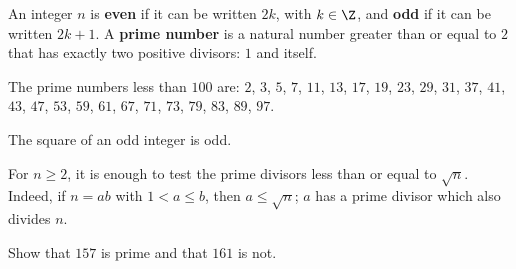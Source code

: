 \begin{keypoint}[Definitions]
An integer $n$ is \textbf{even} if it can be written $2k$, with $k\in\Z$, and \textbf{odd} if it can be written $2k+1$.
A \textbf{prime number} is a natural number greater than or equal to $2$ that has exactly two positive divisors: $1$ and itself.
\end{keypoint}
The prime numbers less than $100$ are: $2$, $3$, $5$, $7$, $11$, $13$, $17$, $19$, $23$, $29$, $31$, $37$, $41$, $43$, $47$, $53$, $59$, $61$, $67$, $71$, $73$, $79$, $83$, $89$, $97$.
\begin{keypoint}
The square of an odd integer is odd.
\end{keypoint}
\begin{method}
For $n\geq2$, it is enough to test the prime divisors less than or equal to $\sqrt n$. Indeed, if $n=ab$ with $1<a\leq b$, then $a\leq\sqrt n$; $a$ has a prime divisor which also divides $n$.
\end{method}
\begin{example}Show that $157$ is prime and that $161$ is not.\end{example}

